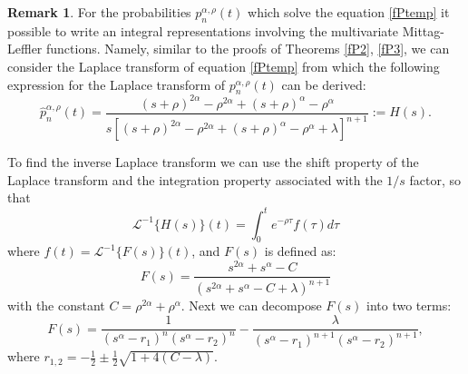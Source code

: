 \documentclass[12pt]{article}
\theoremstyle{definition}
\newtheorem{remark}{Remark}
\theoremstyle{plain}
\begin{document}
\begin{remark} For the probabilities 
	 ${p}^{\alpha,\rho}_n(t)$ which solve the equation \eqref{fPtemp} it possible to write an integral representations involving the multivariate Mittag-Leffler functions. Namely, similar to the proofs of Theorems \ref{fP2}, \ref{fP3}, we can consider the Laplace transform of equation \eqref{fPtemp}  from which the following expression for the Laplace transform of ${p}^{\alpha,\rho}_n(t)$ can be derived:
	\begin{equation*}
		\hat{p}^{\alpha,\rho}_n(t) = \frac{(s+\rho)^{2\alpha} - \rho^{2\alpha} + (s+\rho)^\alpha - \rho^\alpha}{s \left[ (s+\rho)^{2\alpha} - \rho^{2\alpha} + (s+\rho)^\alpha - \rho^\alpha + \lambda \right]^{n+1}} :=H(s).
	\end{equation*}
	
	To find the inverse Laplace transform we can use the shift property of the Laplace transform and the integration property associated with the $1/s$ factor, so that
	\begin{equation*}
		\mathcal{L}^{-1}\{H(s)\}(t) = \int_0^t e^{-\rho \tau} f(\tau) d\tau
	\end{equation*}
	where $f(t) = \mathcal{L}^{-1}\{F(s)\}(t)$, and $F(s)$ is defined as:
	\begin{equation*}
		F(s) = \frac{s^{2\alpha} + s^\alpha - C}{\left( s^{2\alpha} + s^\alpha - C + \lambda \right)^{n+1}}
	\end{equation*}
	with the constant $C = \rho^{2\alpha} + \rho^\alpha$.
		Next we  can decompose $F(s)$ into two  terms:
	\begin{equation*}
		F(s) = \frac{1}{(s^\alpha - r_1)^n (s^\alpha - r_2)^n} - \frac{\lambda}{(s^\alpha - r_1)^{n+1} (s^\alpha - r_2)^{n+1}},
	\end{equation*}
where	$r_{1,2} = -\frac{1}{2} \pm \frac{1}{2}\sqrt{1 + 4(C - \lambda)}$.


\end{remark}
\end{document}
